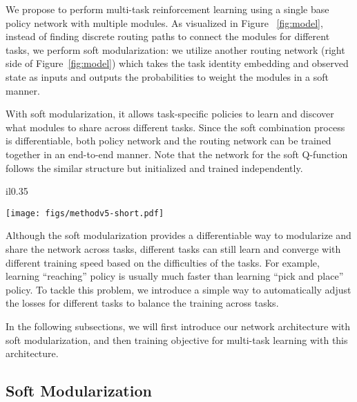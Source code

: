 \documentclass{article}
\begin{document}
We propose to perform multi-task reinforcement learning using a single base policy network with multiple modules. As visualized in Figure ~\ref{fig:model}, instead of finding discrete routing paths to connect the modules for different tasks, we perform soft modularization: we utilize another routing network (right side of Figure~\ref{fig:model}) which takes the task identity embedding and observed state as inputs and outputs the probabilities to weight the modules in a soft manner.

With soft modularization, it allows task-specific policies to learn and discover what modules to share across different tasks. Since the soft combination process is differentiable, both policy network and the routing network can be trained together in an end-to-end manner. Note that the network for the soft Q-function follows the similar structure but initialized and trained independently. 

\begin{wrapfigure}{il}{0.35\textwidth}
  \vspace{-0.25in}
  \begin{center}
    \texttt{[image: figs/methodv5-short.pdf]}
  \end{center}
    \caption{\small{Our framework contains a base policy network with multiple modules (left) and a routing network (right) generating connections between modules in the base policy network. }}
    \label{fig:model}
  \vspace{-0.45in}
\end{wrapfigure}
Although the soft modularization provides a differentiable way to modularize and share the network across tasks, different tasks can still learn and converge with different training speed based on the difficulties of the tasks. For example, learning ``reaching'' policy is usually much faster than learning ``pick and place'' policy. To tackle this problem, we introduce a simple way to automatically adjust the losses for different tasks to balance the training across tasks.

In the following subsections, we will first introduce our network architecture with soft modularization, and then training objective for multi-task learning with this architecture. 

\vspace{-0.07in}
\subsection{Soft Modularization}
\vspace{-0.07in}
\end{document}
